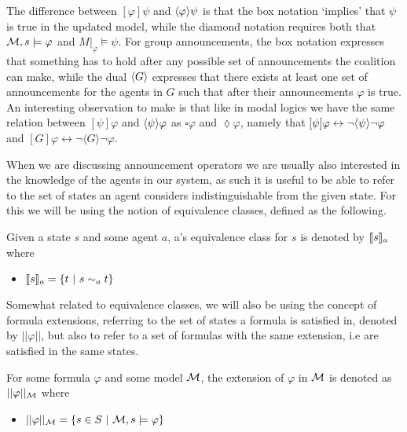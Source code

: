 The difference between $[\varphi]\psi$ and $\langle\varphi\rangle\psi$ is that the box notation `implies' that $\psi$ is true in the updated model, while the diamond notation requires both that $\mathcal{M},s\models \varphi$ and $M|_\varphi \models \psi$. For group announcements, the box notation expresses that something has to hold after any possible set of announcements the coalition can make, while the dual $\langle G\rangle$ expresses that there exists at least one set of announcements for the agents in $G$ such that after their announcements $\varphi$ is true. An interesting observation to make is that like in modal logics we have the same relation between $[\psi]\varphi$ and $\langle\psi\rangle\varphi$ as $\square\varphi$ and $\lozenge\varphi$, namely that $[\psi]\varphi \leftrightarrow \neg\langle\psi\rangle\neg\varphi$ and $[G]\varphi \leftrightarrow \neg\langle G\rangle\neg\varphi$.

When we are discussing announcement operators we are usually also interested in the knowledge of the agents in our system, as such it is useful to be able to refer to the set of states an agent considers indistinguishable from the given state. For this we will be using the notion of equivalence classes, defined as the following.

\begin{definition}
	\label{def:eqclass}
	Given a state $s$ and some agent $a$, a's equivalence class for $s$ is denoted by $\llbracket s\rrbracket_a$ where
	\begin{itemize}
		\item[] $\llbracket s\rrbracket_a = \{t~|~s\sim_a t\}$
	\end{itemize}
\end{definition}

Somewhat related to equivalence classes, we will also be using the concept of formula extensions, referring to the set of states a formula is satisfied in, denoted by $||\varphi||$, but also to refer to a set of formulas with the same extension, i.e are satisfied in the same states.

\begin{definition}
	\label{def:ext}
	For some formula $\varphi$ and some model $\mathcal{M}$, the extension of $\varphi$ in $\mathcal{M}$ is denoted as $||\varphi||_{\mathcal{M}}$ where 
	\begin{itemize}
		\item[] $||\varphi||_{\mathcal{M}} = \{s\in S ~|~\mathcal{M},s\models\varphi\}$
	\end{itemize}
\end{definition}

